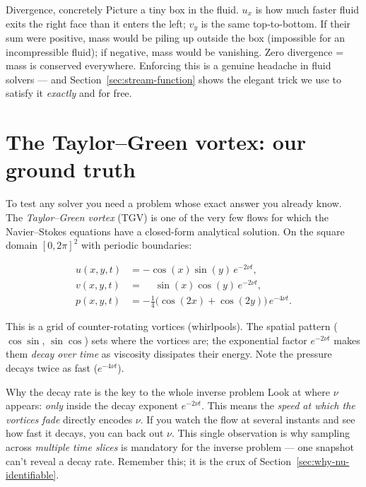 \documentclass[11pt,a4paper]{article}
\begin{document}
\begin{intuitionbox}{Divergence, concretely}
Picture a tiny box in the fluid. $u_x$ is how much faster fluid exits the right
face than it enters the left; $v_y$ is the same top-to-bottom. If their sum were
positive, mass would be piling up outside the box (impossible for an
incompressible fluid); if negative, mass would be vanishing. Zero divergence =
mass is conserved everywhere. Enforcing this is a genuine headache in fluid
solvers --- and Section~\ref{sec:stream-function} shows the elegant trick we use
to satisfy it \emph{exactly} and for free.
\end{intuitionbox}

\section{The Taylor--Green vortex: our ground truth}
\label{sec:tgv}

To test any solver you need a problem whose exact answer you already know. The
\emph{Taylor--Green vortex} (TGV) is one of the very few flows for which the
Navier--Stokes equations have a closed-form analytical solution. On the square
domain $[0, 2\pi]^2$ with periodic boundaries:

\begin{align}
u(x,y,t) &= -\cos(x)\sin(y)\,e^{-2\nu t}, \label{eq:tgv-u}\\
v(x,y,t) &= \phantom{-}\sin(x)\cos(y)\,e^{-2\nu t}, \label{eq:tgv-v}\\
p(x,y,t) &= -\tfrac{1}{4}\big(\cos(2x)+\cos(2y)\big)\,e^{-4\nu t}. \label{eq:tgv-p}
\end{align}

This is a grid of counter-rotating vortices (whirlpools). The spatial pattern
($\cos\sin$, $\sin\cos$) sets where the vortices are; the exponential factor
$e^{-2\nu t}$ makes them \emph{decay over time} as viscosity dissipates their
energy. Note the pressure decays twice as fast ($e^{-4\nu t}$).

\begin{conceptbox}{Why the decay rate is the key to the whole inverse problem}
Look at where $\nu$ appears: \emph{only} inside the decay exponent $e^{-2\nu t}$.
This means the \emph{speed at which the vortices fade} directly encodes $\nu$. If
you watch the flow at several instants and see how fast it decays, you can back
out $\nu$. This single observation is why sampling across \emph{multiple time
slices} is mandatory for the inverse problem --- one snapshot can't reveal a
decay rate. Remember this; it is the crux of Section~\ref{sec:why-nu-identifiable}.
\end{conceptbox}
\end{document}
